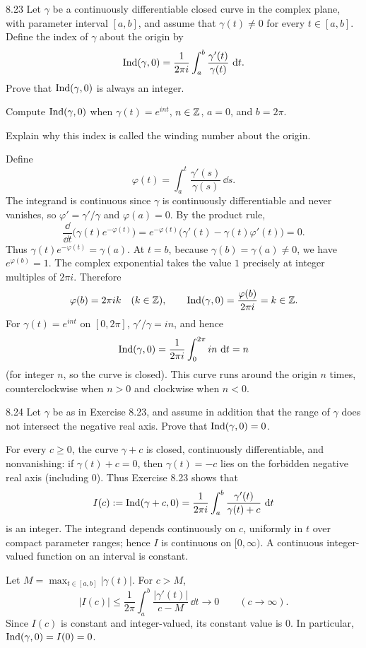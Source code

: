 \documentclass[11pt, oneside]{article}
\begin{document}
\begin{exercise}{8.23}
Let $\gamma$ be a continuously differentiable closed curve in the complex plane, with parameter interval $[a, b]$, and assume that $\gamma(t)\ne0$ for every $t\in[a, b]$. Define the index of $\gamma$ about the origin by
\[
 \operatorname{Ind}(\gamma, 0)=\frac1{2\pi i}\int_a^b\frac{\gamma'(t)}{\gamma(t)}\,\mathop{}\!\mathrm{d} t.
\]
Prove that $\operatorname{Ind}(\gamma, 0)$ is always an integer.

Compute $\operatorname{Ind}(\gamma, 0)$ when $\gamma(t)=e^{int}$, $n\in\mathbb{Z}$, $a=0$, and $b=2\pi$.

Explain why this index is called the winding number about the origin.
\end{exercise}
\begin{solution}
Define
\[
 \varphi(t)=\int_a^t\frac{\gamma'(s)}{\gamma(s)}\,\dd s.
\]
The integrand is continuous since $\gamma$ is continuously differentiable and never vanishes, so $\varphi'=\gamma'/\gamma$ and $\varphi(a)=0$. By the product rule,
\[
 \frac{\dd}{\dd t}\bigl(\gamma(t)e^{-\varphi(t)}\bigr)
 =e^{-\varphi(t)}\bigl(\gamma'(t)-\gamma(t)\varphi'(t)\bigr)=0.
\]
Thus $\gamma(t)e^{-\varphi(t)}=\gamma(a)$. At $t=b$, because $\gamma(b)=\gamma(a)\ne0$, we have $e^{\varphi(b)}=1$. The complex exponential takes the value $1$ precisely at integer multiples of $2\pi i$. Therefore
\[
 \varphi(b)=2\pi i k\quad(k\in\mathbb{Z}), \qquad
 \operatorname{Ind}(\gamma, 0)=\frac{\varphi(b)}{2\pi i}=k\in\mathbb{Z}.
\]
For $\gamma(t)=e^{int}$ on $[0, 2\pi]$, $\gamma'/\gamma=in$, and hence
\[
 \operatorname{Ind}(\gamma, 0)=\frac1{2\pi i}\int_0^{2\pi}in\,\mathop{}\!\mathrm{d} t=n
\]
(for integer $n$, so the curve is closed). This curve runs around the origin $n$ times, counterclockwise when $n>0$ and clockwise when $n<0$.
\end{solution}

\begin{exercise}{8.24}
Let $\gamma$ be as in Exercise 8.23, and assume in addition that the range of $\gamma$ does not intersect the negative real axis. Prove that $\operatorname{Ind}(\gamma, 0)=0$.
\end{exercise}
\begin{solution}
For every $c\ge0$, the curve $\gamma+c$ is closed, continuously differentiable, and nonvanishing: if $\gamma(t)+c=0$, then $\gamma(t)=-c$ lies on the forbidden negative real axis (including $0$). Thus Exercise 8.23 shows that
\[
 I(c):=\operatorname{Ind}(\gamma+c, 0)
 =\frac1{2\pi i}\int_a^b\frac{\gamma'(t)}{\gamma(t)+c}\,\mathop{}\!\mathrm{d} t
\]
is an integer. The integrand depends continuously on $c$, uniformly in $t$ over compact parameter ranges; hence $I$ is continuous on $[0, \infty)$. A continuous integer-valued function on an interval is constant.

Let $M=\max_{t\in[a, b]}|\gamma(t)|$. For $c>M$,
\[
 |I(c)|\le\frac1{2\pi}\int_a^b\frac{|\gamma'(t)|}{c-M}\,\dd t
 \longrightarrow0\qquad(c\to\infty).
\]
Since $I(c)$ is constant and integer-valued, its constant value is $0$. In particular, $\operatorname{Ind}(\gamma, 0)=I(0)=0$.
\end{solution}
\end{document}

